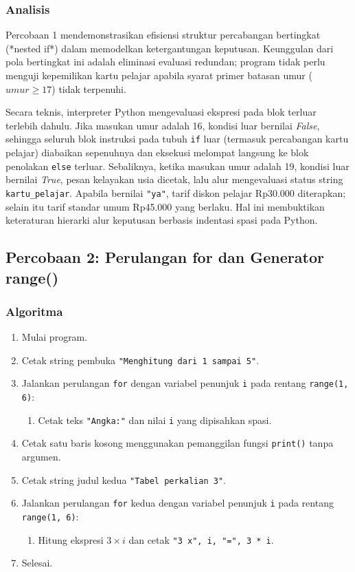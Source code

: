 \documentclass[12pt,a4paper]{article}
\begin{document}
\subsubsection{Analisis}
Percobaan 1 mendemonstrasikan efisiensi struktur percabangan bertingkat (*nested if*) dalam memodelkan ketergantungan keputusan. Keunggulan dari pola bertingkat ini adalah eliminasi evaluasi redundan; program tidak perlu menguji kepemilikan kartu pelajar apabila syarat primer batasan umur ($umur \ge 17$) tidak terpenuhi.

Secara teknis, interpreter Python mengevaluasi ekspresi pada blok terluar terlebih dahulu. Jika masukan umur adalah 16, kondisi luar bernilai \textit{False}, sehingga seluruh blok instruksi pada tubuh \texttt{if} luar (termasuk percabangan kartu pelajar) diabaikan sepenuhnya dan eksekusi melompat langsung ke blok penolakan \texttt{else} terluar. Sebaliknya, ketika masukan umur adalah 19, kondisi luar bernilai \textit{True}, pesan kelayakan usia dicetak, lalu alur mengevaluasi status string \texttt{kartu\_pelajar}. Apabila bernilai \texttt{"ya"}, tarif diskon pelajar Rp30.000 diterapkan; selain itu tarif standar umum Rp45.000 yang berlaku. Hal ini membuktikan keteraturan hierarki alur keputusan berbasis indentasi spasi pada Python.

\subsection{Percobaan 2: Perulangan for dan Generator range()}
\subsubsection{Algoritma}
\begin{enumerate}
    \item Mulai program.
    \item Cetak string pembuka \texttt{"Menghitung dari 1 sampai 5"}.
    \item Jalankan perulangan \texttt{for} dengan variabel penunjuk \texttt{i} pada rentang \texttt{range(1, 6)}:
    \begin{enumerate}[label=\alph*.]
        \item Cetak teks \texttt{"Angka:"} dan nilai \texttt{i} yang dipisahkan spasi.
    \end{enumerate}
    \item Cetak satu baris kosong menggunakan pemanggilan fungsi \texttt{print()} tanpa argumen.
    \item Cetak string judul kedua \texttt{"Tabel perkalian 3"}.
    \item Jalankan perulangan \texttt{for} kedua dengan variabel penunjuk \texttt{i} pada rentang \texttt{range(1, 6)}:
    \begin{enumerate}[label=\alph*.]
        \item Hitung ekspresi $3 \times i$ dan cetak \texttt{"3 x", i, "=", 3 * i}.
    \end{enumerate}
    \item Selesai.
\end{enumerate}
\end{document}
